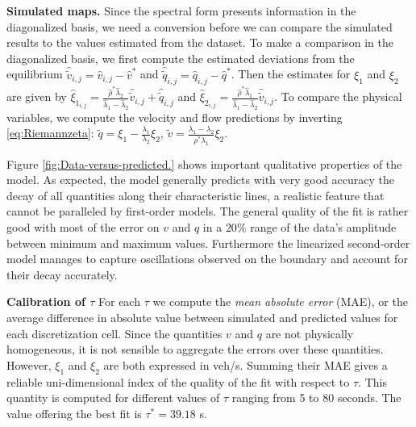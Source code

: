 \documentclass[5p,twocolumn]{elsarticle}
\begin{document}
\textbf{Simulated maps.} Since the spectral form presents information in the diagonalized basis, we need a conversion before we can compare the simulated results to the values estimated from the dataset.  
To make a comparison in the diagonalized basis, we first compute the estimated deviations from the equilibrium $\widehat{\widetilde{v}}_{i,j}=\widehat{v}_{i,j}-\widehat{v}^{*}$ and $\widehat{\widetilde{q}}_{i,j}=\widehat{q}_{i,j}-\widehat{q}^{*}$. Then the estimates for $\xi_{1}$ and $\xi_{2}$ are given by $\widehat{\xi}_{1_{i,j}}=\frac{\widehat{\rho}^{*}\widehat{\lambda}_{2}}{\widehat{\lambda}_{1}-\widehat{\lambda}_{2}}\widehat{\widetilde{v}}_{i,j}+\widehat{\widetilde{q}}_{i,j}$ and
$\widehat{\xi}_{2_{i,j}}=\frac{\widehat{\rho}^{*}\widehat{\lambda}_{1}}{\widehat{\lambda}_{1}-\widehat{\lambda}_{2}}\widehat{\widetilde{v}}_{i,j}$. To compare the physical variables, we compute the velocity and flow predictions by inverting \eqref{eq:Riemannzeta}: $\widetilde{q}=\xi_{1}-\frac{\lambda_{1}}{\lambda_{2}}\xi_{2}$,
$\widetilde{v}=\frac{\lambda_{1}-\lambda_{2}}{\rho^{*}\lambda_{1}}\xi_{2}$.

Figure \ref{fig:Data-versus-predicted.} shows important qualitative properties of the model. As expected, the model generally predicts with very good accuracy the decay of all quantities along their characteristic lines, a realistic feature that cannot be paralleled by first-order models. The general quality of the fit is rather good with most of the error on $v$ and $q$ in a $20\%$ range of the data's amplitude between minimum and maximum values. Furthermore the linearized second-order model manages to capture oscillations observed on the boundary and account for their decay accurately. 

\textbf{Calibration of $\tau$\label{sub:Calibration-of-tau}} For each $\tau$ we compute the \textit{mean absolute error} (MAE), or the average difference in absolute value between simulated and predicted values for each discretization cell. Since the quantities $v$ and $q$ are not physically homogeneous, it is not sensible to aggregate the errors over these quantities. However, $\xi_{1}$
and $\xi_{2}$ are both expressed in veh/s. Summing their MAE gives a reliable uni-dimensional index of the quality of the fit with respect
to $\tau$. This quantity is computed for different values of $\tau$
ranging from 5 to 80 seconds. The value offering the best fit
is $\tau^{*}=39.18$ s.
\end{document}
